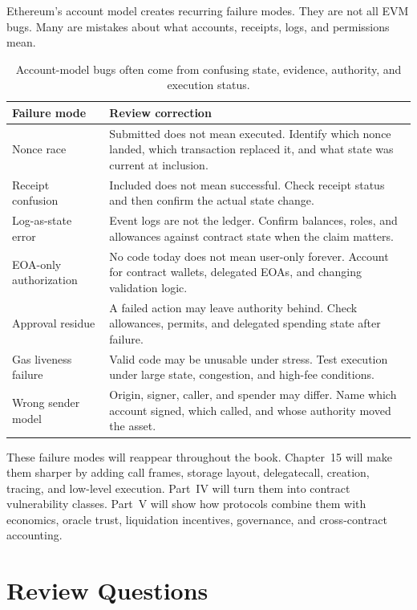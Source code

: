 Ethereum's account model creates recurring failure modes. They are not all EVM bugs. Many are mistakes about what accounts, receipts, logs, and permissions mean.

\begin{table}[htbp]
\centering
\small
\renewcommand{\arraystretch}{1.18}
\begin{tabularx}{\textwidth}{@{}>{\RaggedRight\arraybackslash}p{}X@{}}
\toprule
Failure mode & Review correction \\
\midrule
Nonce race & Submitted does not mean executed. Identify which nonce landed, which transaction replaced it, and what state was current at inclusion. \\
Receipt confusion & Included does not mean successful. Check receipt status and then confirm the actual state change. \\
Log-as-state error & Event logs are not the ledger. Confirm balances, roles, and allowances against contract state when the claim matters. \\
EOA-only authorization & No code today does not mean user-only forever. Account for contract wallets, delegated EOAs, and changing validation logic. \\
Approval residue & A failed action may leave authority behind. Check allowances, permits, and delegated spending state after failure. \\
Gas liveness failure & Valid code may be unusable under stress. Test execution under large state, congestion, and high-fee conditions. \\
Wrong sender model & Origin, signer, caller, and spender may differ. Name which account signed, which called, and whose authority moved the asset. \\
\bottomrule
\end{tabularx}
\caption{Account-model bugs often come from confusing state, evidence, authority, and execution status.}
\end{table}

These failure modes will reappear throughout the book. Chapter~15 will make them sharper by adding call frames, storage layout, delegatecall, creation, tracing, and low-level execution. Part~IV will turn them into contract vulnerability classes. Part~V will show how protocols combine them with economics, oracle trust, liquidation incentives, governance, and cross-contract accounting.

\section*{Review Questions}

